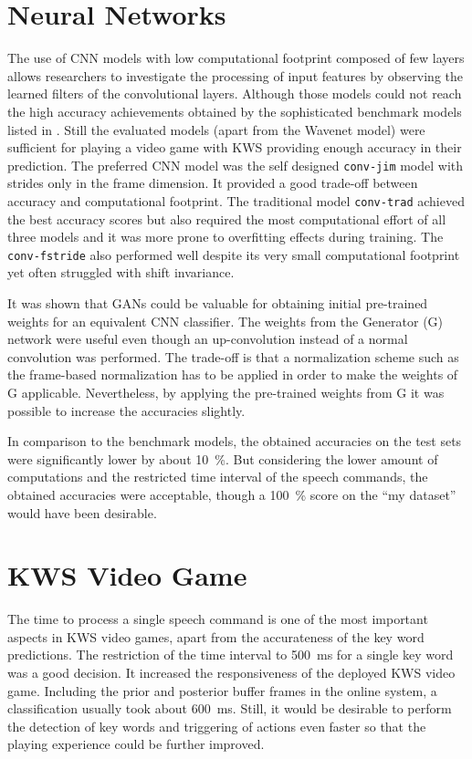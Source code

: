 \section{Neural Networks}
The use of CNN models with low computational footprint composed of few layers allows researchers to investigate the processing of input features by observing the learned filters of the convolutional layers.
Although those models could not reach the high accuracy achievements obtained by the sophisticated benchmark models listed in .
Still the evaluated models (apart from the Wavenet model) were sufficient for playing a video game with KWS providing enough accuracy in their prediction.
The preferred CNN model was the self designed \texttt{conv-jim} model with strides only in the frame dimension.
It provided a good trade-off between accuracy and computational footprint.
The traditional model \texttt{conv-trad} achieved the best accuracy scores but also required the most computational effort of all three models and it was more prone to overfitting effects during training.
The \texttt{conv-fstride} also performed well despite its very small computational footprint yet often struggled with shift invariance.

It was shown that GANs could be valuable for obtaining initial pre-trained weights for an equivalent CNN classifier.
The weights from the Generator (G) network were useful even though an up-convolution instead of a normal convolution was performed.
The trade-off is that a normalization scheme such as the frame-based normalization has to be applied in order to make the weights of G applicable.
Nevertheless, by applying the pre-trained weights from G it was possible to increase the accuracies slightly.

In comparison to the benchmark models, the obtained accuracies on the test sets were significantly lower by about \SI{10}{\percent}.
But considering the lower amount of computations and the restricted time interval of the speech commands, the obtained accuracies were acceptable, though a \SI{100}{\percent} score on the \enquote{my dataset} would have been desirable.



\section{KWS Video Game}
The time to process a single speech command is one of the most important aspects in KWS video games, apart from the accurateness of the key word predictions.
The restriction of the time interval to \SI{500}{\milli\second} for a single key word was a good decision.
It increased the responsiveness of the deployed KWS video game.
Including the prior and posterior buffer frames in the online system, a classification usually took about \SI{600}{\milli\second}.
Still, it would be desirable to perform the detection of key words and triggering of actions even faster so that the playing experience could be further improved.

